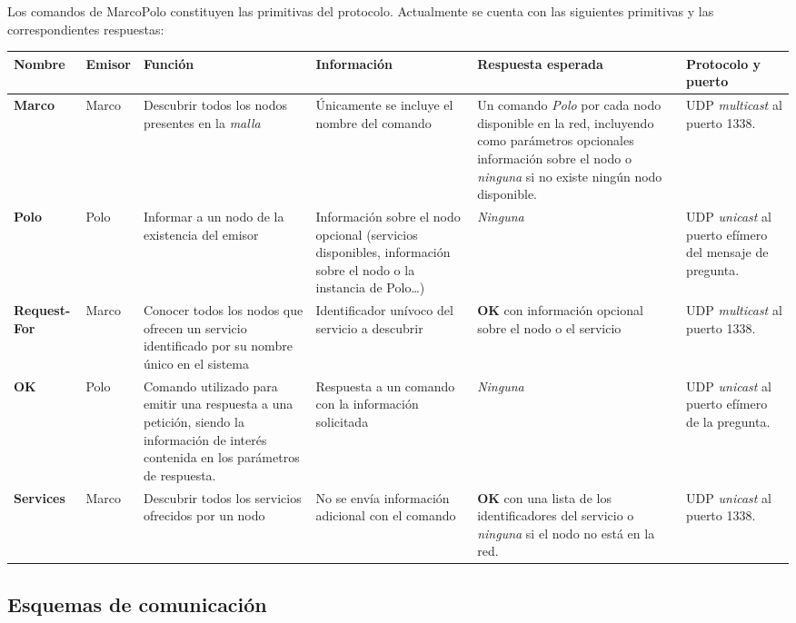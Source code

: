 Los comandos de MarcoPolo constituyen las primitivas del protocolo. Actualmente se cuenta con las siguientes primitivas y las correspondientes respuestas:
\begin{landscape}
\begin{table}[H]
\begin{tabular}{|p{1.5cm}|p{1.2cm}|p{5cm}|p{5cm}|p{5cm}|p{3.5cm}|}
\hline
Nombre & Emisor & Función & Información & Respuesta esperada & Protocolo y puerto\\ \hline
\textbf{Marco} & Marco & Descubrir todos los nodos presentes en la \textit{malla} & Únicamente se incluye el nombre del comando & Un comando \textit{Polo} por cada nodo disponible en la red, incluyendo como parámetros opcionales información sobre el nodo o \textit{ninguna} si no existe ningún nodo disponible. & UDP \textit{multicast} al puerto 1338.\\ \hline
\textbf{Polo} & Polo & Informar a un nodo de la existencia del emisor & Información sobre el nodo opcional (servicios disponibles, información sobre el nodo o la instancia de Polo\dots) & \textit{Ninguna} &  UDP \textit{unicast} al puerto efímero del mensaje de pregunta.\\ \hline
\textbf{Request-For} & Marco & Conocer todos los nodos que ofrecen un servicio identificado por su nombre único en el sistema & Identificador unívoco del servicio a descubrir & \textbf{OK} con información opcional sobre el nodo o el servicio & UDP \textit{multicast} al puerto 1338.\\ \hline
\textbf{OK} & Polo & Comando utilizado para emitir una respuesta a una petición, siendo la información de interés contenida en los parámetros de respuesta. & Respuesta a un comando con la información solicitada & \textit{Ninguna} & UDP \textit{unicast} al puerto efímero de la pregunta.\\ \hline
\textbf{Services} & Marco & Descubrir todos los servicios ofrecidos por un nodo & No se envía información adicional con el comando & \textbf{OK} con una lista de los identificadores del servicio o \textit{ninguna} si el nodo no está en la red. & UDP \textit{unicast} al puerto 1338.\\ \hline
\end{tabular}
\end{table}
\end{landscape}

\subsection{Esquemas de comunicación}

